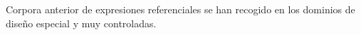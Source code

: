 


Corpora anterior de expresiones referenciales se han recogido en los dominios de dise\~no especial y muy controladas. 


